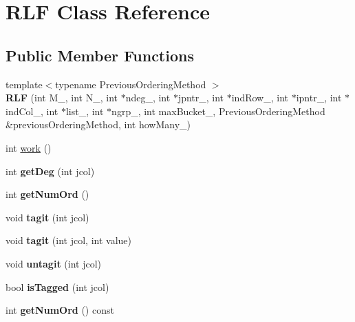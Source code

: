 \hypertarget{classRLF}{
\section{RLF Class Reference}
\label{classRLF}
}
\subsection*{Public Member Functions}
\begin{DoxyCompactItemize}
\item 
\hypertarget{classRLF_a5d1fd0749544610d7573ab3cb2fecf1a}{
{\footnotesize template$<$typename PreviousOrderingMethod $>$ }\\{\bfseries RLF} (int M\_\-, int N\_\-, int $\ast$ndeg\_\-, int $\ast$jpntr\_\-, int $\ast$indRow\_\-, int $\ast$ipntr\_\-, int $\ast$indCol\_\-, int $\ast$list\_\-, int $\ast$ngrp\_\-, int maxBucket\_\-, PreviousOrderingMethod \&previousOrderingMethod, int howMany\_\-)}
\label{classRLF_a5d1fd0749544610d7573ab3cb2fecf1a}

\item 
int \hyperlink{classRLF_a327af9b44d25f836502b0184a98e673d}{work} ()
\item 
\hypertarget{classRLF_acde1c9e75affce9be79796b065b71d29}{
int {\bfseries getDeg} (int jcol)}
\label{classRLF_acde1c9e75affce9be79796b065b71d29}

\item 
\hypertarget{classRLF_acfd8a03e49e1122927b297de5d2e5aca}{
int {\bfseries getNumOrd} ()}
\label{classRLF_acfd8a03e49e1122927b297de5d2e5aca}

\item 
\hypertarget{classRLF_a188650f31e55c11f0dbbc2fc53697ec6}{
void {\bfseries tagit} (int jcol)}
\label{classRLF_a188650f31e55c11f0dbbc2fc53697ec6}

\item 
\hypertarget{classRLF_a1aef590b0a66b214e48378c9b8618d6f}{
void {\bfseries tagit} (int jcol, int value)}
\label{classRLF_a1aef590b0a66b214e48378c9b8618d6f}

\item 
\hypertarget{classRLF_a5c45cecd023ceff0279a6155b26fc0ce}{
void {\bfseries untagit} (int jcol)}
\label{classRLF_a5c45cecd023ceff0279a6155b26fc0ce}

\item 
\hypertarget{classRLF_aefb3a2f842f26794c5f9dff02dd79dd7}{
bool {\bfseries isTagged} (int jcol)}
\label{classRLF_aefb3a2f842f26794c5f9dff02dd79dd7}

\item 
\hypertarget{classRLF_a83954f50be5700233af332d0e3a36ca4}{
int {\bfseries getNumOrd} () const }
\label{classRLF_a83954f50be5700233af332d0e3a36ca4}

\end{DoxyCompactItemize}
